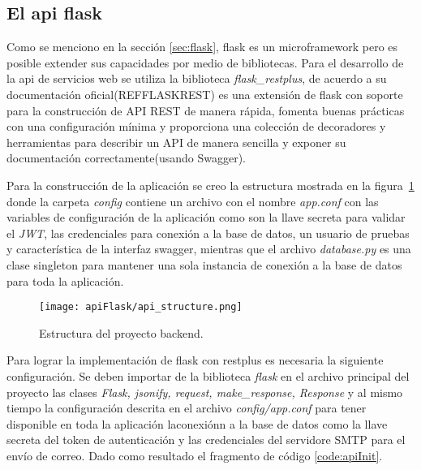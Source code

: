 \subsection{El api flask} \label{sec:apiFlask}

Como se menciono en la sección \ref{sec:flask}, flask es un microframework pero es posible extender sus capacidades por medio de bibliotecas. Para el desarrollo de la api de servicios web se utiliza la biblioteca \textit{flask\_restplus}, de acuerdo a su documentación oficial(REFFLASKREST) es una extensión de flask con soporte para la construcción de API REST de manera rápida, fomenta buenas prácticas con una configuración mínima y proporciona una colección de decoradores y herramientas para describir un API de manera sencilla y exponer su documentación correctamente(usando Swagger).

Para la construcción de la aplicación se creo la estructura mostrada en la figura~\ref{img:apiStructure} donde la carpeta \textit{config} contiene un archivo con el nombre \textit{app.conf} con las variables de configuración de la aplicación como son la llave secreta para validar el \textit{JWT}, las credenciales para conexión a la base de datos, un usuario de pruebas y característica de la interfaz swagger, mientras que el archivo \textit{database.py} es una clase singleton para mantener una sola instancia de conexión a la base de datos para toda la aplicación.

\begin{figure}[H]
  \centering
  \texttt{[image: apiFlask/api\_structure.png]}
  \caption{Estructura del proyecto backend.}
  \label{img:apiStructure}
\end{figure}

Para lograr la implementación de flask con restplus es necesaria la siguiente configuración. Se deben importar de la biblioteca \textit{flask } en el archivo principal del proyecto las clases \textit{Flask, jsonify, request, make\_response, Response} y al mismo tiempo la configuración descrita en el archivo \textit{config/app.conf} para tener disponible en toda la aplicación laconexiónn a la base de datos como la llave secreta del token de autenticación y las credenciales del servidore SMTP para el envío de correo. Dado como resultado el fragmento de código \ref{code:apiInit}.

